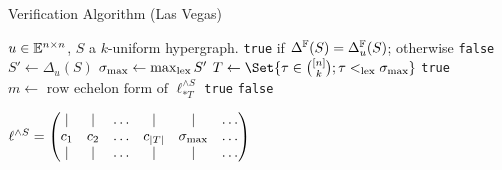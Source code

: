 \documentclass[9pt]{beamer}
\begin{document}

\begin{frame}[fragile]{Verification Algorithm (Las Vegas)}
   \begin{algorithm}[H]
    \begin{algorithmic}[1]
      \REQUIRE $u \in {\mathbb E}^{n \times n}$, $S$ a $k$-uniform hypergraph.
      \ENSURE \texttt{true} if $\Delta^{{\mathbb F}}(S) = \Delta^{{\mathbb F}}_u(S)$; otherwise \texttt{false}
      \STATE $S' \gets \Delta_u(S)$
      \STATE $\sigma_{\text{max}} \gets \max_{\text{lex}} S'$
      \STATE $T \gets \Set{\tau \in \binom{[n]}{k} ; \tau \lex< \sigma_\text{max}}$
      \RETURN \texttt{true}
      \ENDIF
      \STATE $m \gets \text{ row echelon form of } \ell^{\wedge S}_{*T}$
      \RETURN \texttt{true}
      \ENDIF
      \RETURN \texttt{false}
    \end{algorithmic}
    \caption{Verify $u$ computes the algebraic shift of $S$}
    \label{alg:seq}
  \end{algorithm}
  \begin{center}
    $\ell^{\wedge S} = \begin{pmatrix}
      |   & |     & \dots & |           & |                    & \dots\\
      c_1 & c_2   & \dots & c_{\lvert T\rvert} &  \sigma_{\text{max}} & \dots\\
      |   & |     & \dots & |           & |                    & \dots 
    \end{pmatrix}
    $
  \end{center}
\end{frame}


\end{document}
